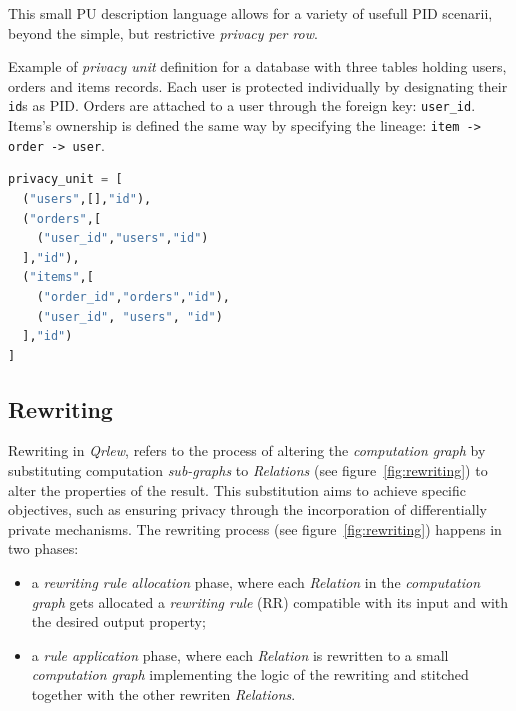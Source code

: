 \documentclass[letterpaper]{article} %
\newcommand{\qrlew}{\emph{Qrlew}}
\begin{document}
This small PU description language allows for a variety of usefull PID scenarii, beyond the simple, but restrictive \emph{privacy per row}.

\begin{listing}[tb]
\caption{Example of \emph{privacy unit} definition for a database with three tables holding users, orders and items records. Each user is protected individually by designating their \texttt{id}s as PID. Orders are attached to a user through the foreign key: \texttt{user\_id}. Items's ownership is defined the same way by specifying the lineage: \texttt{item -> order -> user}.}%
\label{lst:pe}
\begin{lstlisting}[language=Python]
privacy_unit = [
  ("users",[],"id"),
  ("orders",[
    ("user_id","users","id")
  ],"id"),
  ("items",[
    ("order_id","orders","id"),
    ("user_id", "users", "id")
  ],"id")
]
\end{lstlisting}
\end{listing}

\subsection{Rewriting}
\label{sec:rewritting}

Rewriting in \qrlew{}, refers to the process of altering the \emph{computation graph} by substituting computation \emph{sub-graphs} to \emph{Relations} (see figure~\ref{fig:rewriting}) to alter the properties of the result. This substitution aims to achieve specific objectives, such as ensuring privacy through the incorporation of differentially private mechanisms. The rewriting process (see figure~\ref{fig:rewriting}) happens in two phases:
\begin{itemize}
    \item a \emph{rewriting rule allocation} phase, where each \emph{Relation} in the \emph{computation graph} gets allocated a \emph{rewriting rule} (RR) compatible with its input and with the desired output property;
    \item a \emph{rule application} phase, where each \emph{Relation} is rewritten to a small \emph{computation graph} implementing the logic of the rewriting and stitched together with the other rewriten \emph{Relations}.
\end{itemize}
\end{document}
